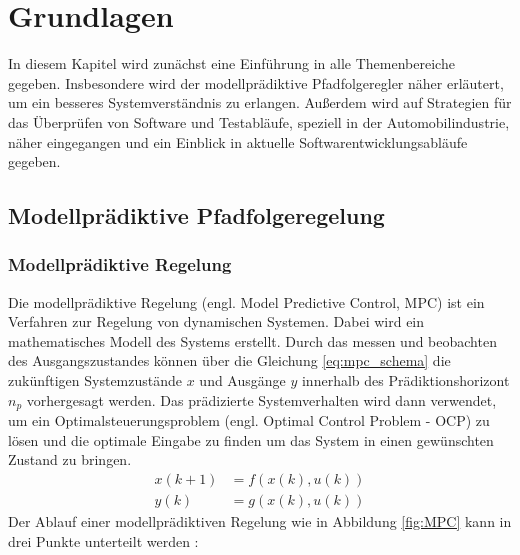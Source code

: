 \chapter{Grundlagen} \label{chap:Grundlagen}
\thispagestyle{empty}
In diesem Kapitel wird zunächst eine Einführung in alle Themenbereiche gegeben. Insbesondere wird der modellprädiktive Pfadfolgeregler näher erläutert, um ein besseres Systemverständnis zu erlangen. Außerdem wird auf  Strategien für das Überprüfen von Software und Testabläufe, speziell in der Automobilindustrie, näher eingegangen und ein Einblick in aktuelle Softwarentwicklungsabläufe gegeben. 
\section{Modellprädiktive Pfadfolgeregelung} \label{sec:MPFC}
\subsection{Modellprädiktive Regelung}
Die modellprädiktive Regelung (engl. Model Predictive Control, MPC) ist ein Verfahren zur Regelung von dynamischen Systemen. Dabei wird ein mathematisches Modell des Systems erstellt. Durch das messen und beobachten des Ausgangszustandes können über die Gleichung \ref{eq:mpc_schema} die zukünftigen Systemzustände $x$ und Ausgänge $y
$ innerhalb des Prädiktionshorizont $n_p$ vorhergesagt werden. Das prädizierte Systemverhalten wird dann verwendet, um ein Optimalsteuerungsproblem (engl. Optimal Control Problem - OCP) zu lösen und die optimale Eingabe zu finden um das System in einen gewünschten Zustand zu bringen.
\begin{equation}
    \begin{split}
        x(k+1)  &= f(x(k), u(k)) \\
        y(k)    &= g(x(k), u(k))
    \end{split}
    \label{eq:mpc_schema}
\end{equation}
Der Ablauf einer modellprädiktiven Regelung wie in Abbildung \ref{fig:MPC} kann in drei Punkte unterteilt werden \cite{camacho2013model}:
